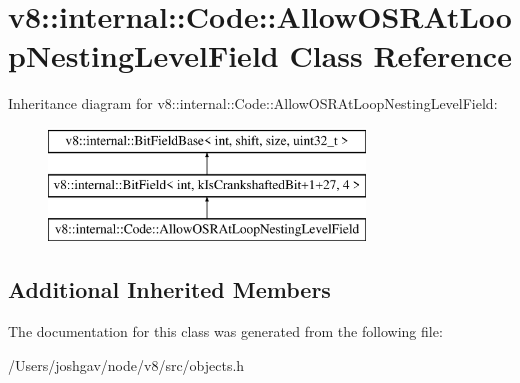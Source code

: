 \hypertarget{classv8_1_1internal_1_1_code_1_1_allow_o_s_r_at_loop_nesting_level_field}{}\section{v8\+:\+:internal\+:\+:Code\+:\+:Allow\+O\+S\+R\+At\+Loop\+Nesting\+Level\+Field Class Reference}
\label{classv8_1_1internal_1_1_code_1_1_allow_o_s_r_at_loop_nesting_level_field}
Inheritance diagram for v8\+:\+:internal\+:\+:Code\+:\+:Allow\+O\+S\+R\+At\+Loop\+Nesting\+Level\+Field\+:\begin{figure}[H]
\begin{center}
\leavevmode
\includegraphics[height=3.000000cm]{classv8_1_1internal_1_1_code_1_1_allow_o_s_r_at_loop_nesting_level_field}
\end{center}
\end{figure}
\subsection*{Additional Inherited Members}


The documentation for this class was generated from the following file\+:\begin{DoxyCompactItemize}
\item 
/\+Users/joshgav/node/v8/src/objects.\+h\end{DoxyCompactItemize}
